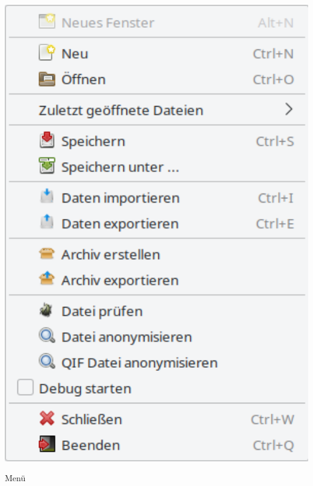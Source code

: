 \hspace{10pt}	
\begin{minipage}{.3\linewidth}
	\vspace{-10pt}					%
	\centering						%
	\includegraphics[width=1\textwidth]{image/screenshot/home_menubar_file}
	\vspace{-10pt}					%
	\captionsetup{
		type=figure,%
		name=Abb.,%
		labelsep=newline}			%
	\caption{Menü }	%
	\label{home_menubar_file}
\end{minipage}

